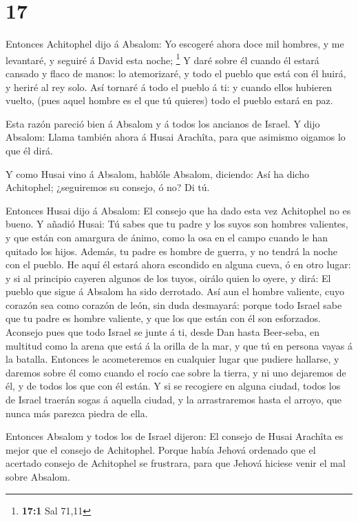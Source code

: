 \hypertarget{section-16}{%
\section{17}\label{section-16}}

 Entonces Achitophel dijo á Absalom: Yo escogeré ahora
doce mil hombres, y me levantaré, y seguiré á David esta noche;
\footnote{\textbf{17:1} Sal 71,11}  Y daré sobre él cuando
él estará cansado y flaco de manos: lo atemorizaré, y todo el pueblo que
está con él huirá, y heriré al rey solo.  Así tornaré á
todo el pueblo á ti: y cuando ellos hubieren vuelto, (pues aquel hombre
es el que tú quieres) todo el pueblo estará en paz.

 Esta razón pareció bien á Absalom y á todos los ancianos
de Israel.  Y dijo Absalom: Llama también ahora á Husai
Arachîta, para que asimismo oigamos lo que él dirá.

 Y como Husai vino á Absalom, hablóle Absalom, diciendo:
Así ha dicho Achitophel; ¿seguiremos su consejo, ó no? Di tú.

 Entonces Husai dijo á Absalom: El consejo que ha dado
esta vez Achitophel no es bueno.  Y añadió Husai: Tú sabes
que tu padre y los suyos son hombres valientes, y que están con amargura
de ánimo, como la osa en el campo cuando le han quitado los hijos.
Además, tu padre es hombre de guerra, y no tendrá la noche con el
pueblo.  He aquí él estará ahora escondido en alguna
cueva, ó en otro lugar: y si al principio cayeren algunos de los tuyos,
oirálo quien lo oyere, y dirá: El pueblo que sigue á Absalom ha sido
derrotado.  Así aun el hombre valiente, cuyo corazón sea
como corazón de león, sin duda desmayará: porque todo Israel sabe que tu
padre es hombre valiente, y que los que están con él son esforzados.
 Aconsejo pues que todo Israel se junte á ti, desde Dan
hasta Beer-seba, en multitud como la arena que está á la orilla de la
mar, y que tú en persona vayas á la batalla.  Entonces le
acometeremos en cualquier lugar que pudiere hallarse, y daremos sobre él
como cuando el rocío cae sobre la tierra, y ni uno dejaremos de él, y de
todos los que con él están.  Y si se recogiere en alguna
ciudad, todos los de Israel traerán sogas á aquella ciudad, y la
arrastraremos hasta el arroyo, que nunca más parezca piedra de ella.

 Entonces Absalom y todos los de Israel dijeron: El
consejo de Husai Arachîta es mejor que el consejo de Achitophel. Porque
había Jehová ordenado que el acertado consejo de Achitophel se
frustrara, para que Jehová hiciese venir el mal sobre Absalom.

